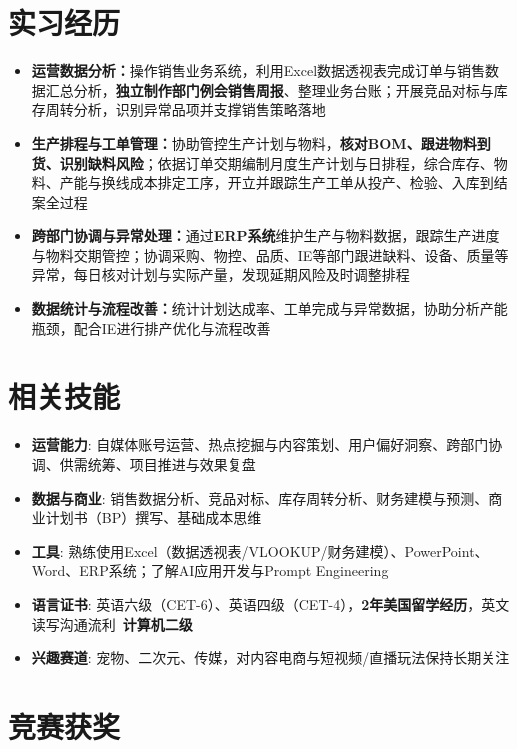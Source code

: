 \documentclass{resume}
\begin{document}
\section{实习经历}
\begin{itemize}[parsep=0.05ex]
  \item \textbf{运营数据分析：}操作销售业务系统，利用Excel数据透视表完成订单与销售数据汇总分析，\textbf{独立制作部门例会销售周报}、整理业务台账；开展竞品对标与库存周转分析，识别异常品项并支撑销售策略落地
  \item \textbf{生产排程与工单管理：}协助管控生产计划与物料，\textbf{核对BOM、跟进物料到货、识别缺料风险}；依据订单交期编制月度生产计划与日排程，综合库存、物料、产能与换线成本排定工序，开立并跟踪生产工单从投产、检验、入库到结案全过程
  \item \textbf{跨部门协调与异常处理：}通过\textbf{ERP系统}维护生产与物料数据，跟踪生产进度与物料交期管控；协调采购、物控、品质、IE等部门跟进缺料、设备、质量等异常，每日核对计划与实际产量，发现延期风险及时调整排程
  \item \textbf{数据统计与流程改善：}统计计划达成率、工单完成与异常数据，协助分析产能瓶颈，配合IE进行排产优化与流程改善
\end{itemize}

\section{相关技能}
\begin{itemize}[parsep=0.2ex]
  \item \textbf{运营能力}: 自媒体账号运营、热点挖掘与内容策划、用户偏好洞察、跨部门协调、供需统筹、项目推进与效果复盘
  \item \textbf{数据与商业}: 销售数据分析、竞品对标、库存周转分析、财务建模与预测、商业计划书（BP）撰写、基础成本思维
  \item \textbf{工具}: 熟练使用Excel（数据透视表/VLOOKUP/财务建模）、PowerPoint、Word、ERP系统；了解AI应用开发与Prompt Engineering
  \item \textbf{语言证书}: 英语六级（CET-6）、英语四级（CET-4），\textbf{2年美国留学经历}，英文读写沟通流利\textperiodcentered\ \textbf{计算机二级}
  \item \textbf{兴趣赛道}: 宠物、二次元、传媒，对内容电商与短视频/直播玩法保持长期关注
\end{itemize}

\section{竞赛获奖}
\end{document}

